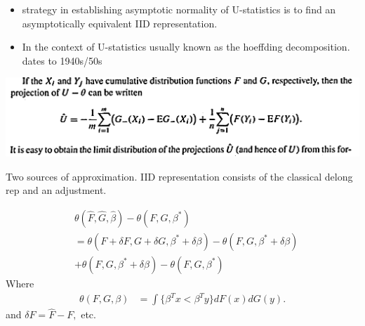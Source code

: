 \documentclass{beamer}
\renewcommand{\t}[1]{{#1}^T}
\renewcommand{\star}[1]{{#1}^\ast}
\newcommand{\F}{F}
\newcommand{\G}{G}
\newcommand{\auc}{\theta}
\newcommand{\kernel}[2]{\{#1 < #2\}}
\newcommand{\speak}[1]{
  \iftoggle{speaktoggle}{
    {\tiny{\textcolor{red}{speak: #1}}\normalsize}
  }
  {}
}
\begin{document}
\begin{frame}
  \begin{itemize}
\item strategy in establishing asymptotic normality of U-statistics is to find an asymptotically
equivalent IID representation.

\item In the context of U-statistics usually known
as the hoeffding decomposition. dates to 1940s/50s

\end{itemize}
\vspace{.1in}
\includegraphics[width=\textwidth]{vdvaart}
\end{frame}



\begin{frame}
Two sources of approximation. IID representation consists of the classical delong rep and an adjustment.

\begin{align}
  &\auc(\hat\F,\hat\G,\hat\beta) - \auc(\F,\G,\star\beta)\\
  &=\auc(\F+\delta\F,\G+\delta\G,\star\beta+\delta\beta) - \auc(\F,\G,\star\beta+\delta\beta) \\
    &+ \auc(\F,\G,\star\beta+\delta\beta)-\auc(\F,\G,\star\beta)
\end{align}
Where \begin{align}
  \auc(F,G,\beta) &= \int\kernel{\t\beta x}{\t\beta y}dF(x)dG(y).
\end{align}
and $\delta\F=\hat\F-\F,$ etc.
\end{frame}
\end{document}
